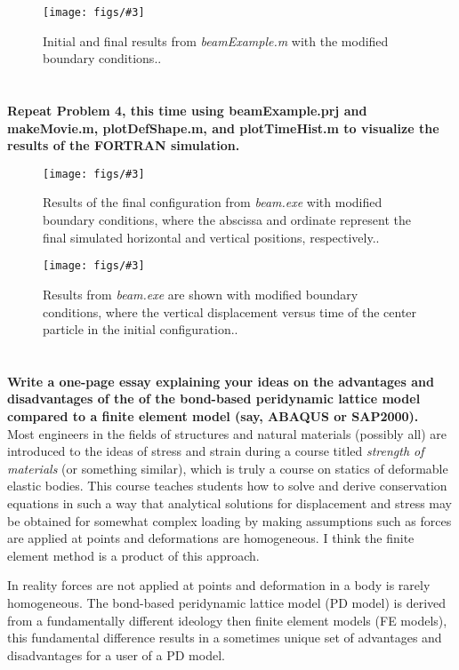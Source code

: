 \documentclass[letterpaper, 10pt, oneside]{article}
\newenvironment{dd}[1]{
	\noindent
	\textbf{\normalsize{#1}}
	\hspace{0.1in}
	\small
	\rmfamily
	}
	{\medskip}
\newcommand{\bdd}{\begin{dd}}
\newcommand{\edd}{\end{dd}}
\newcommand{\Figure}[4]{
  \begin{figure}[#1]
    \centering
    \texttt{[image: figs/\#3]}
    \caption{#4.}\label{fig:#3}
  \end{figure}}
\begin{document}
\Figure{htp}{4}{4_def.pdf}{Initial and final results from \emph{beamExample.m} with the modified boundary conditions.}
\edd

\section{}
\bdd{Repeat Problem 4, this time using beamExample.prj and makeMovie.m, plotDefShape.m, and plotTimeHist.m to visualize the results of the FORTRAN simulation.}

\Figure{htp}{4}{5_def.pdf}{Results of the final configuration from \emph{beam.exe} with modified boundary conditions, where the abscissa and ordinate represent the final simulated horizontal and vertical positions, respectively.}

\Figure{htp}{4}{5_hist.pdf}{Results from \emph{beam.exe} are shown with modified boundary conditions, where the vertical displacement versus time of the center particle in the initial configuration.}
\edd

\section{}
\bdd{ Write a one-page essay explaining your ideas on the advantages and disadvantages of the of the bond-based peridynamic lattice model compared to a finite element model (say, ABAQUS or SAP2000).}\\

Most engineers in the fields of structures and natural materials (possibly all) are introduced to the ideas of stress and strain during a course titled \emph{strength of materials} (or something similar), which is truly a course on statics of deformable elastic bodies. This course teaches students how to solve and derive conservation equations in such a way that analytical solutions for displacement and stress may be obtained for somewhat complex loading by making assumptions such as forces are applied at points and deformations are homogeneous.  I think the finite element method is a product of this approach.

In reality forces are not applied at points and deformation in a body is rarely homogeneous. The bond-based peridynamic lattice model (PD model) is derived from a fundamentally different ideology then finite element models (FE models), this fundamental difference results in a sometimes unique set of advantages and disadvantages for a user of a PD model.  
\end{document}
